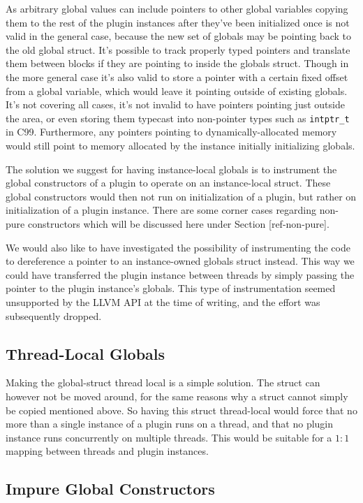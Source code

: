 As arbitrary global values can include pointers to other global variables
copying them to the rest of the plugin instances after they've been initialized
once is not valid in the general case, because the new set of globals may be
pointing back to the old global struct.
It's possible to track properly typed pointers and translate them between blocks
if they are pointing to inside the globals struct.
Though in the more general case it's also valid to store a pointer with a
certain fixed offset from a global variable, which would leave it pointing
outside of existing globals.
It's not covering all cases, it's not invalid to have pointers pointing just
outside the area, or even storing them typecast into non-pointer types such as
\texttt{intptr\_t} in C99.
Furthermore, any pointers pointing to dynamically-allocated memory would still
point to memory allocated by the instance initially initializing globals.

The solution we suggest for having instance-local globals is to instrument the
global constructors of a plugin to operate on an instance-local struct.
These global constructors would then not run on initialization of a plugin, but
rather on initialization of a plugin instance.
There are some corner cases regarding non-pure constructors which will be
discussed here under Section [ref-non-pure].

We would also like to have investigated the possibility of instrumenting the
code to dereference a pointer to an instance-owned globals struct instead.
This way we could have transferred the plugin instance between threads by simply
passing the pointer to the plugin instance's globals.
This type of instrumentation seemed unsupported by the LLVM API at the time of
writing, and the effort was subsequently dropped.

\subsection {Thread-Local Globals}

Making the global-struct thread local is a simple solution.
The struct can however not be moved around, for the same reasons why a struct
cannot simply be copied mentioned above.
So having this struct thread-local would force that no more than a single
instance of a plugin runs on a thread, and that no plugin instance runs
concurrently on multiple threads.
This would be suitable for a $1:1$ mapping between threads and plugin instances.

\subsection {Impure Global Constructors}

